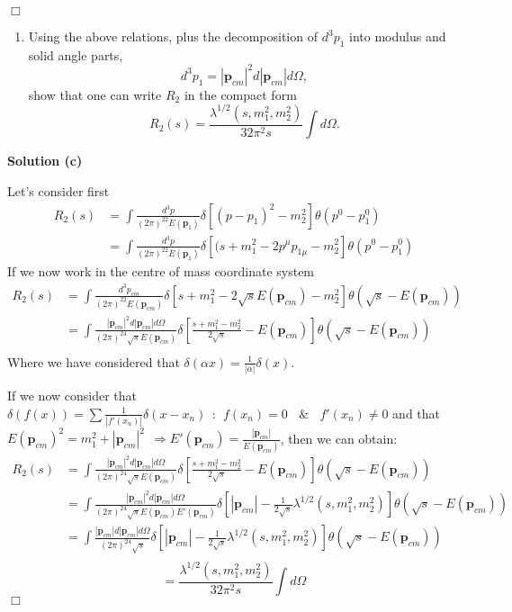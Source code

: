 \documentclass[12pt]{article}
\newcommand{\qedwhite}{\hfill \ensuremath{\Box}}
\begin{document}
\qedwhite

\color{black}

\begin{enumerate}[label=(\alph*), start = 3]
    \item Using the above relations, plus the decomposition of $d^3p_1$ into modulus and solid angle parts,
        \[
            d^3p_1 = \left|\mathbf{p}_{cm}\right|^2d\left|\mathbf{p}_{cm}\right|d\Omega,
        \]
        show that one can write $R_2$ in the compact form
        \[
            R_2(s) = \frac{\lambda^{1/2}(s,m_1^2,m_2^2)}{32\pi^2s}\int d\Omega.
        \]
\end{enumerate}

\color{blue}

\textbf{Solution (c)}

Let's consider first
\[
    \begin{aligned}
        R_2(s) &= \int  \frac{d^3p}{(2\pi)^22E(\mathbf{p}_1)} \delta[(p-p_1)^2 - m_2^2]\theta(p^0-p_1^0) \\
               &= \int  \frac{d^3p}{(2\pi)^22E(\mathbf{p}_1)} \delta[(s + m_1^2 -2p^\mu p_{1\mu} - m_2^2]\theta(p^0-p_1^0)
    \end{aligned}
\]
If we now work in the centre of mass coordinate system
\[
    \begin{aligned}
        R_2(s) &= \int  \frac{d^3p_{cm}}{(2\pi)^22E(\mathbf{p}_{cm})} \delta[s + m_1^2 -2\sqrt{s}E(\mathbf{p}_{cm}) - m_2^2]\theta(\sqrt{s}-E(\mathbf{p}_{cm})) \\
               &= \int \frac{|\mathbf{p}_{cm}|^2d|\mathbf{p}_{cm}|d\Omega}{(2\pi)^24\sqrt{s}E(\mathbf{p}_{cm})} \delta\left[\frac{s + m_1^2 - m_2^2}{2\sqrt{s}} - E(\mathbf{p}_{cm})\right]\theta(\sqrt{s}-E(\mathbf{p}_{cm})) \\ 
    \end{aligned}
\]
Where we have considered that $\delta(\alpha x) = \frac{1}{|\alpha|}\delta(x)$. 

If we now consider that $\delta(f(x)) = \sum \frac{1}{|f'(x_n)|} \delta(x-x_n)~~:~~ f(x_n) = 0 ~~~~\&~~~~ f'(x_n)\neq 0$ and that $E(\mathbf{p}_{cm})^2 = m_1^2 + |\mathbf{p}_{cm}|^2~~\Longrightarrow E'(\mathbf{p}_{cm})=\frac{|\mathbf{p}_{cm}|}{E(\mathbf{p}_{cm})}$, then we can obtain:
\[
    \begin{aligned}
        R_2(s) &=  \int \frac{|\mathbf{p}_{cm}|^2d|\mathbf{p}_{cm}|d\Omega}{(2\pi)^24\sqrt{s}E(\mathbf{p}_{cm})} \delta\left[\frac{s + m_1^2 - m_2^2}{2\sqrt{s}} - E(\mathbf{p}_{cm})\right]\theta(\sqrt{s}-E(\mathbf{p}_{cm})) \\ 
               &= \int \frac{|\mathbf{p}_{cm}|^2d|\mathbf{p}_{cm}|d\Omega}{(2\pi)^24\sqrt{s}E(\mathbf{p}_{cm})E'(\mathbf{p}_{cm})} \delta\left[\left|\mathbf{p}_{cm}\right|-\frac{1}{2\sqrt{s}}\lambda^{1/2}(s,m_1^2,m_2^2)\right]\theta(\sqrt{s}-E(\mathbf{p}_{cm})) \\ 
               &= \int \frac{|\mathbf{p}_{cm}|d|\mathbf{p}_{cm}|d\Omega}{(2\pi)^24\sqrt{s}} \delta\left[\left|\mathbf{p}_{cm}\right|-\frac{1}{2\sqrt{s}}\lambda^{1/2}(s,m_1^2,m_2^2)\right]\theta(\sqrt{s}-E(\mathbf{p}_{cm})) \\
    \end{aligned}
\]
\[
    = \frac{\lambda^{1/2}(s,m_1^2,m_2^2)}{32\pi^2 s}\int d\Omega
\]
\qedwhite
\end{document}
